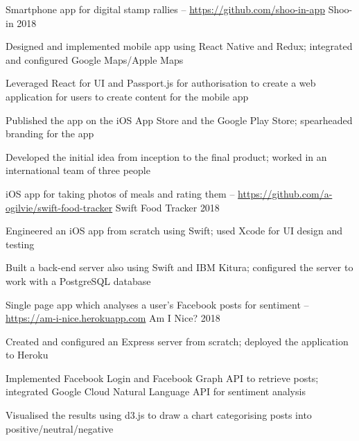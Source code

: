 


\begin{cventries}

  \cventry
  {Smartphone app for digital stamp rallies --  \url{https://github.com/shoo-in-app}} %
  {Shoo-in} %
  {} %
  {2018} %
  {
    \begin{cvitems} %
      \item {Designed and implemented mobile app using React Native and Redux; integrated and configured Google Maps/Apple Maps}
      \item {Leveraged React for UI and Passport.js for authorisation to create a web application for users to create content for the mobile app}
      \item {Published the app on the iOS App Store and the Google Play Store; spearheaded branding for the app}
      \item {Developed the initial idea from inception to the final product; worked in an international team of three people}
    \end{cvitems}
  }

  \cventry
  {iOS app for taking photos of meals and rating them -- \url{https://github.com/a-ogilvie/swift-food-tracker}} %
  {Swift Food Tracker} %
  {} %
  {2018} %
  {
    \begin{cvitems} %
      \item {Engineered an iOS app from scratch using Swift; used Xcode for UI design and testing}
      \item {Built a back-end server also using Swift and IBM Kitura; configured the server to work with a PostgreSQL database}
    \end{cvitems}
  }

  \cventry
  {Single page app which analyses a user's Facebook posts for sentiment -- \url{https://am-i-nice.herokuapp.com}} %
  {Am I Nice?} %
  {} %
  {2018} %
  {
    \begin{cvitems} %
      \item {Created and configured an Express server from scratch; deployed the application to Heroku}
      \item {Implemented Facebook Login and Facebook Graph API to retrieve posts; integrated Google Cloud Natural Language API for sentiment analysis}
      \item {Visualised the results using d3.js to draw a chart categorising posts into positive/neutral/negative}
    \end{cvitems}
  }


\end{cventries}
